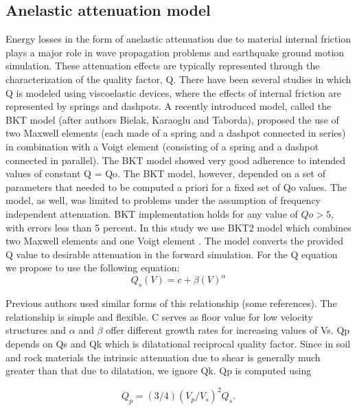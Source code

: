 \subsection{Anelastic attenuation model}

Energy losses in the form of anelastic attenuation due to material internal friction plays a major role in wave propagation problems and earthquake ground motion simulation. These attenuation effects are typically represented through the characterization of the quality factor, Q. There have been several studies in which Q is modeled using viscoelastic devices, where the effects of internal friction are represented by springs and dashpots. A recently introduced model, called the BKT model (after authors Bielak, Karaoglu and Taborda), proposed the use of two Maxwell elements (each made of a spring and a dashpot connected in series) in combination with a Voigt element (consisting of a spring and a dashpot connected in parallel). The BKT model showed very good adherence to intended values of constant Q = Qo. The BKT model, however, depended on a set of parameters that needed to be computed a priori for a fixed set of Qo values. The model, as well, was limited to problems under the assumption of frequency independent attenuation. BKT implementation holds for any value of $Qo > 5$, with errors less than 5 percent. In this study we use BKT2 model which combines two Maxwell elements and one Voigt element \citep{Bielak2011}. The model converts the provided Q value to desirable attenuation in the forward simulation. For the Q equation we propose to use the following equation: \\

\begin{equation}
Q_{s}(V) = c + \beta(V)^{\alpha}
\end{equation}

Previous authors used similar forms of this relationship (some references). The relationship is simple and flexible. C serves as floor value for low velocity structures and $\alpha$ and $\beta$ offer different growth rates for increasing values of Vs. Qp depends on Qs and Qk which is dilatational reciprocal quality factor. Since in soil and rock materials the intrinsic attenuation due to shear is generally much greater than that due to dilatation, we ignore Qk. Qp is computed using

\begin{equation}
Q_{p}=(3/4)(V_p/V_{s})^2Q_{s}.
\end{equation}

